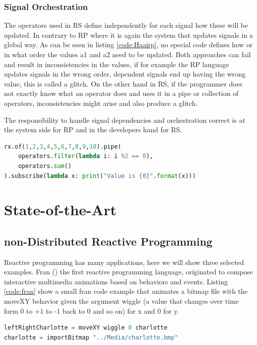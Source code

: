\documentclass[a4paper]{book}
\begin{document}
\subsubsection{Signal Orchestration}
The operators used in RS define independently for each signal how these will be updated. In contrary to RP where it is again the system that updates signals in a global way. As can be seen in listing \ref{code:Haairp}, no special code defines how or in what order the values a1 and a2 need to be updated. Both approaches can fail and result in inconsistencies in the values, if for example the RP language updates signals in the wrong order, dependent signals end up having the wrong value, this is called a glitch. On the other hand in RS, if the programmer does not exactly know what an operator does and uses it in a pipe or collection of operators, inconsistencies might arise and also produce a glitch. 

\vspace{1em} %
\noindent
The responsibility to handle signal dependencies and orchestration correct is at the system side for RP and in the developers hand for RS.


\begin{lstlisting}[language=Python, caption={Python, RxPy library},captionpos=b, label={code:rxpy}, basicstyle=\small\ttfamily, frame=single]
rx.of(1,2,3,4,5,6,7,8,9,10).pipe(
	operators.filter(lambda i: i %2 == 0),
	operators.sum()
).subscribe(lambda x: print("Value is {0}".format(x)))
\end{lstlisting}


\section{State-of-the-Art}

\subsection{non-Distributed Reactive Programming}
Reactive programming has many applications, here we will show three selected examples. Fran (\cite{DBLP:conf/icfp/ElliottH97}) the first reactive programming language, originated to compose interactive multimedia animations based on behaviors and events. Listing \ref{code:fran} show a small fran code example that animates a bitmap file with the moveXY behavior given the argument wiggle (a value that changes over time form 0 to +1 to -1 back to 0 and so on) for x and 0 for y.
\begin{lstlisting}[language=Python, caption={Fran, animation (\cite{DrDobb})},captionpos=b, label={code:fran}, basicstyle=\small\ttfamily, frame=single]
leftRightCharlotte = moveXY wiggle 0 charlotte
charlotte = importBitmap "../Media/charlotte.bmp"
\end{lstlisting}
\end{document}
